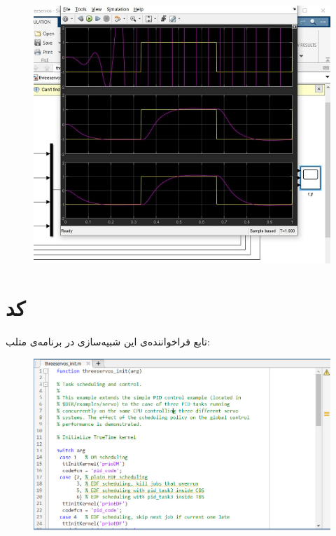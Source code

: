 \begin{figure}[H]
	\centering
	\includegraphics{10.jpg}
	\label{fig:label4}
\end{figure}

\newpage

\section*{کد }

تابع فراخواننده‌ی این شبیه‌سازی در برنامه‌ی متلب:

\begin{figure}[H]
	\centering
	\includegraphics{16.jpg}
	\label{fig:label4}
\end{figure}

